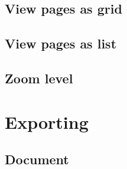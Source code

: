 \documentclass[10pt,a4paper]{article}
\begin{document}
\subsection{View pages as grid}



\subsection{View pages as list}



\subsection{Zoom level}



\section{Exporting}



\subsection{Document}
\end{document}
